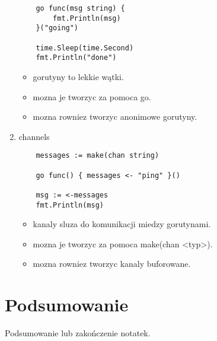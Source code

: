 \documentclass[11pt,a4paper]{article}
\begin{document}
\begin{enumerate}
\begin{verbatim}
    go func(msg string) {
        fmt.Println(msg)
    }("going")

    time.Sleep(time.Second)
    fmt.Println("done")
    \end{verbatim}
    \begin{itemize}
        \item gorutyny to lekkie wątki.
        \item mozna je tworzyc za pomoca go.
        \item mozna rowniez tworzyc anonimowe gorutyny.
    \end{itemize}
\item channels \begin{verbatim}
    messages := make(chan string)

    go func() { messages <- "ping" }()

    msg := <-messages
    fmt.Println(msg)
    \end{verbatim}
    \begin{itemize}
        \item kanaly sluza do komunikacji miedzy gorutynami.
        \item mozna je tworzyc za pomoca make(chan <typ>).
        \item mozna rowniez tworzyc kanaly buforowane.
    \end{itemize}
\end{enumerate}




\section{Podsumowanie}
Podsumowanie lub zakończenie notatek.
\end{document}
